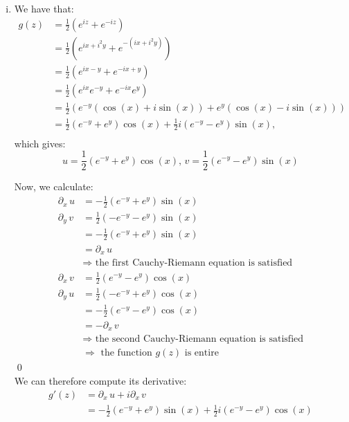 \documentclass[a4paper, titlepage, DIV=14]{scrartcl}
\begin{document}
\begin{enumerate}
\begin{enumerate}[i)]
            \item We have that:
            \begin{align*}
                g(z) &= \frac{1}{2}(e^{iz}+e^{-iz}) \\
                    &= \frac{1}{2}(e^{ix+i^{2}y}+e^{-(ix+i^{2}y)}) \\
                    &= \frac{1}{2}(e^{ix-y} + e^{-ix+y} ) \\
                    &= \frac{1}{2}(e^{ix}e^{-y} + e^{-ix}e^{y}) \\
                    &= \frac{1}{2}( e^{-y}(\cos(x)+i\sin(x)) + e^{y}(\cos(x)-i\sin(x)) ) \\
                    &= \frac{1}{2}(e^{-y}+e^{y})\cos(x) + \frac{1}{2}i(e^{-y}-e^{y})\sin(x), \\
            \end{align*} which gives:
            \begin{equation*}
                u = \frac{1}{2}(e^{-y}+e^{y})\cos(x), \, v=\frac{1}{2}(e^{-y}-e^{y})\sin(x)
            \end{equation*}

            Now, we calculate:
            \begin{align*}
               \partial_{x} \, u &= -\frac{1}{2}(e^{-y}+e^{y})\sin(x) \\
               \partial_{y} \, v &= \frac{1}{2}(-e^{-y}-e^{y})\sin(x) \\
                                &= -\frac{1}{2}(e^{-y}+e^{y})\sin(x) \\
                                &= \partial_{x} \, u \\
                                &\Rightarrow \text{ the first Cauchy-Riemann equation is satisfied} \\
                \partial_{x} \, v &= \frac{1}{2}(e^{-y}-e^{y})\cos(x) \\
                \partial_{y} \, u &= \frac{1}{2}(-e^{-y} + e^{y})\cos(x) \\
                                &= -\frac{1}{2}(e^{-y} - e^{y})\cos(x) \\
                                &= -\partial_{x} \, v \\
                                &\Rightarrow \text{ the second Cauchy-Riemann equation is satisfied} \\
                                &\Rightarrow \text{ the function }g(z)\text{ is entire}
            \end{align*} \qed \\
            We can therefore compute its derivative:
            \begin{align*}
                g'(z) &= \partial_{x} \, u + i\partial_{x} \, v \\
                    &= -\frac{1}{2}(e^{-y}+e^{y})\sin(x) + \frac{1}{2}i(e^{-y}-e^{y})\cos(x)
            \end{align*}
        \end{enumerate}
    \end{enumerate}
\end{document}
